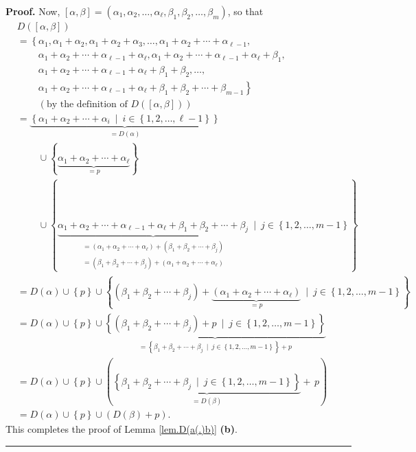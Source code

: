 \documentclass[numbers=enddot,12pt,final,onecolumn,notitlepage,abstracton]{scrartcl}%
\theoremstyle{definition}
\newenvironment{proof}[1][Proof]{\noindent\textbf{#1.} }{\ \rule{0.5em}{0.5em}}
\newenvironment{verlong}{}{}
\begin{document}
\begin{verlong}
\begin{proof}
Now, $\left[  \alpha,\beta\right]  =\left(  \alpha_{1},\alpha_{2}%
,\ldots,\alpha_{\ell},\beta_{1},\beta_{2},\ldots,\beta_{m}\right)  $, so that%
\begin{align*}
&  D\left(  \left[  \alpha,\beta\right]  \right) \\
&  =\left\{  \alpha_{1},\alpha_{1}+\alpha_{2},\alpha_{1}+\alpha_{2}+\alpha
_{3},\ldots,\alpha_{1}+\alpha_{2}+\cdots+\alpha_{\ell-1},\right. \\
&  \ \ \ \ \ \ \ \ \ \ \left.  \alpha_{1}+\alpha_{2}+\cdots+\alpha_{\ell
-1}+\alpha_{\ell},\alpha_{1}+\alpha_{2}+\cdots+\alpha_{\ell-1}+\alpha_{\ell
}+\beta_{1},\right. \\
&  \ \ \ \ \ \ \ \ \ \ \left.  \alpha_{1}+\alpha_{2}+\cdots+\alpha_{\ell
-1}+\alpha_{\ell}+\beta_{1}+\beta_{2},\ldots,\right. \\
&  \ \ \ \ \ \ \ \ \ \ \left.  \alpha_{1}+\alpha_{2}+\cdots+\alpha_{\ell
-1}+\alpha_{\ell}+\beta_{1}+\beta_{2}+\cdots+\beta_{m-1}\right\} \\
&  \ \ \ \ \ \ \ \ \ \ \left(  \text{by the definition of }D\left(  \left[
\alpha,\beta\right]  \right)  \right) \\
&  =\underbrace{\left\{  \alpha_{1}+\alpha_{2}+\cdots+\alpha_{i}\ \mid
\ i\in\left\{  1,2,\ldots,\ell-1\right\}  \right\}  }_{=D\left(
\alpha\right)  }\\
&  \ \ \ \ \ \ \ \ \ \ \cup\left\{  \underbrace{\alpha_{1}+\alpha_{2}%
+\cdots+\alpha_{\ell}}_{=p}\right\} \\
&  \ \ \ \ \ \ \ \ \ \ \cup\left\{  \underbrace{\alpha_{1}+\alpha_{2}%
+\cdots+\alpha_{\ell-1}+\alpha_{\ell}+\beta_{1}+\beta_{2}+\cdots+\beta_{j}%
}_{\substack{=\left(  \alpha_{1}+\alpha_{2}+\cdots+\alpha_{\ell}\right)
+\left(  \beta_{1}+\beta_{2}+\cdots+\beta_{j}\right)  \\=\left(  \beta
_{1}+\beta_{2}+\cdots+\beta_{j}\right)  +\left(  \alpha_{1}+\alpha_{2}%
+\cdots+\alpha_{\ell}\right)  }}\ \mid\ j\in\left\{  1,2,\ldots,m-1\right\}
\right\} \\
&  =D\left(  \alpha\right)  \cup\left\{  p\right\}  \cup\left\{  \left(
\beta_{1}+\beta_{2}+\cdots+\beta_{j}\right)  +\underbrace{\left(  \alpha
_{1}+\alpha_{2}+\cdots+\alpha_{\ell}\right)  }_{=p}\ \mid\ j\in\left\{
1,2,\ldots,m-1\right\}  \right\} \\
&  =D\left(  \alpha\right)  \cup\left\{  p\right\}  \cup\underbrace{\left\{
\left(  \beta_{1}+\beta_{2}+\cdots+\beta_{j}\right)  +p\ \mid\ j\in\left\{
1,2,\ldots,m-1\right\}  \right\}  }_{=\left\{  \beta_{1}+\beta_{2}%
+\cdots+\beta_{j}\ \mid\ j\in\left\{  1,2,\ldots,m-1\right\}  \right\}  +p}\\
&  =D\left(  \alpha\right)  \cup\left\{  p\right\}  \cup\left(
\underbrace{\left\{  \beta_{1}+\beta_{2}+\cdots+\beta_{j}\ \mid\ j\in\left\{
1,2,\ldots,m-1\right\}  \right\}  }_{=D\left(  \beta\right)  }+\,p\right) \\
&  =D\left(  \alpha\right)  \cup\left\{  p\right\}  \cup\left(  D\left(
\beta\right)  +p\right)  .
\end{align*}
This completes the proof of Lemma \ref{lem.D(a(.)b)} \textbf{(b)}.
\end{proof}
\end{verlong}
\end{document}
